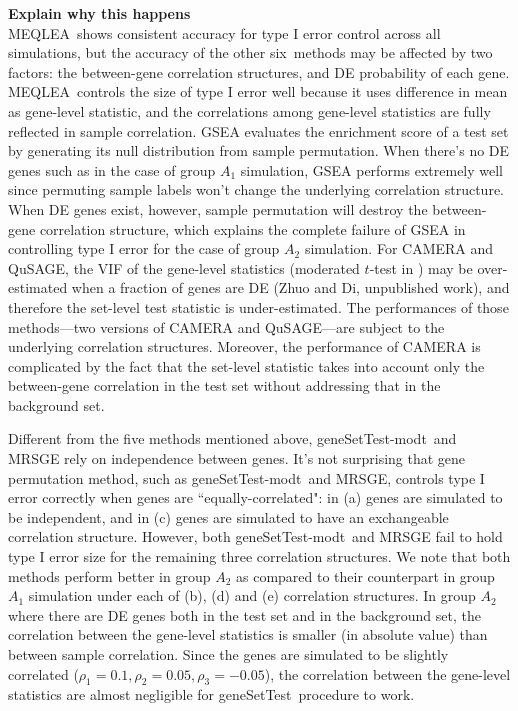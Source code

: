 \documentclass[useAMS,usenatbib, galley]{biom}
\newcommand{\OurMethod}{MEQLEA}
\newcommand{\HowmanyTest}{six}
\newcommand{\aaCase}{a}
\newcommand{\aCase}{b}
\newcommand{\cCase}{c}
\newcommand{\eCase}{d}
\newcommand{\fCase}{e}
\newcommand{\gent}{geneSetTest-modt}
\newcommand{\gen}{geneSetTest}
\newcommand{\thepapertobefinished}{Zhuo and Di, unpublished work}
\begin{document}
	\textbf{Explain why this happens}\\
	\OurMethod~shows consistent accuracy for type I error control across all simulations, but the accuracy of the other \HowmanyTest~methods may be affected by two factors: the between-gene correlation structures, and DE probability of each gene. \OurMethod~controls the size of type I error well because it uses difference in mean as gene-level statistic, and the correlations among gene-level statistics are fully reflected in sample correlation. GSEA evaluates the enrichment score of a test set by generating its null distribution from sample permutation. When there's no DE genes such as in the case of group $A_1$ simulation, GSEA performs extremely well since permuting sample labels won't change the underlying correlation structure. When DE genes exist, however, sample permutation will destroy the between-gene correlation structure, which explains the complete failure of GSEA in controlling type I error for the case of group $A_2$ simulation. For CAMERA and QuSAGE, the VIF of the gene-level statistics (moderated $t$-test in \cite{wu2012camera}) may be over-estimated when a fraction of genes are DE (\thepapertobefinished), and therefore the set-level test statistic is under-estimated. The performances of those methods---two versions of CAMERA and QuSAGE---are subject to the underlying correlation structures. Moreover, the performance of CAMERA is complicated by the fact that the set-level statistic takes into account only the between-gene correlation in the test set without addressing that in the background set.
	
	Different from the five methods mentioned above, \gent~and MRSGE rely on independence between genes. It's not surprising that gene permutation method, such as \gent~and MRSGE, controls type I error correctly when genes are ``equally-correlated": in (\aaCase) genes are simulated to be independent, and in (\cCase) genes are simulated to have an exchangeable correlation structure. However, both \gent~and MRSGE fail to hold type I error size for the remaining three correlation structures. We note that both methods perform better in group $A_2$ as compared to their counterpart in group $A_1$ simulation under each of (\aCase), (\eCase) and (\fCase) correlation structures. In group $A_2$ where there are DE genes both in the test set and in the background set, the correlation between the gene-level statistics is smaller (in absolute value) than between sample correlation. Since the genes are simulated to be slightly correlated ($\rho_1=0.1, \rho_2 = 0.05, \rho_3 = -0.05$), the correlation between the gene-level statistics are almost negligible for \gen~procedure to work. 
	
\end{document}
